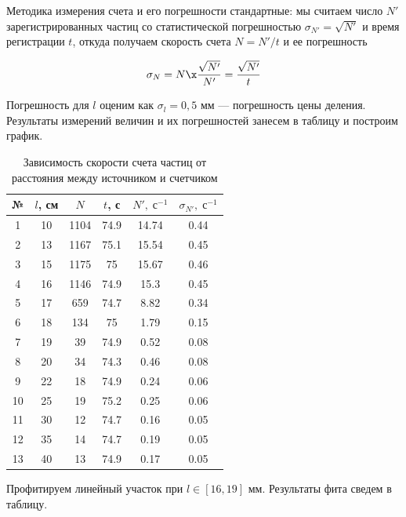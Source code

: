 \documentclass[12pt]{kiarticle}
\begin{document}
		Методика измерения счета и его погрешности стандартные: мы считаем число $ N' $ зарегистрированных частиц со статистической погрешностью $ \sigma_{N'}  = \sqrt{N'} $ и время регистрации $ t $, откуда получаем скорость счета $ N = N'/t $ и ее погрешность 
		
		 \begin{equation}\label{}
		\sigma_{N} = N \x \dfrac{\sqrt{N'}}{N'} = \dfrac{\sqrt{N'}}{t}
		\end{equation}
	
		Погрешность для $ l $ оценим как $ \sigma_l = 0,5 $ мм --- погрешность цены деления. Результаты измерений величин и их погрешностей занесем в таблицу и построим график.
		
			\begin{table}[H]
			\caption{Зависимость скорости счета частиц от расстояния между источником и счетчиком}
			\begin{center}
				\begin{tabular}{|c|c|c|c|c|c|}
					\hline 
					№ & $ l $, см & $ N $ & $ t $, с & $ N', \; с^{-1} $ & $ \sigma_{N'}, \; с^{-1} $  \\ 
					\hline 
				1 & 10 & 1104 & 74.9 & 14.74 & 0.44 \\
				2 & 13 & 1167 & 75.1 & 15.54 & 0.45 \\
				3 & 15 & 1175 & 75 & 15.67 & 0.46 \\
				4 & 16 & 1146 & 74.9 & 15.3 & 0.45 \\
				5 & 17 & 659 & 74.7 & 8.82 & 0.34 \\
				6 & 18 & 134 & 75 & 1.79 & 0.15 \\
				7 & 19 & 39 & 74.9 & 0.52 & 0.08 \\
				8 & 20 & 34 & 74.3 & 0.46 & 0.08 \\
				9 & 22 & 18 & 74.9 & 0.24 & 0.06 \\
				10 & 25 & 19 & 75.2 & 0.25 & 0.06 \\
				11 & 30 & 12 & 74.7 & 0.16 & 0.05 \\
				12 & 35 & 14 & 74.7 & 0.19 & 0.05 \\
				13 & 40 & 13 & 74.9 & 0.17 & 0.05 \\
					\hline 
				\end{tabular} 
			\end{center}
			\label{table g}
		\end{table}
	
	Профитируем линейный участок при $ l \in [16,19] $ мм. Результаты фита сведем в таблицу.
		
\end{document}
